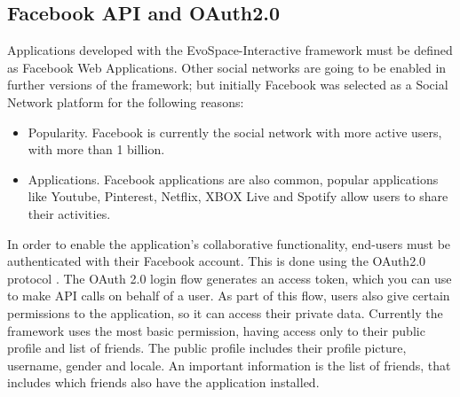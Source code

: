 \documentclass{sig-alternate}
\begin{document}
\subsection{Facebook API and OAuth2.0}
Applications developed with the EvoSpace-Interactive framework must be defined as Facebook Web Applications. Other social networks are going to be enabled in further versions of the framework; but initially Facebook was selected as a Social Network platform for the following reasons:
\begin{itemize}
	\item Popularity. Facebook is currently the social network with more active users, with more than 1 billion. 

	\item Applications. Facebook applications are also common, popular applications like Youtube, Pinterest, Netflix, XBOX Live and Spotify allow users to share their activities.	
\end{itemize}
In order to enable the application's collaborative functionality, end-users must be authenticated with their Facebook account. This is done using the OAuth2.0 protocol \cite{hammer2011oauth}. The OAuth 2.0 login flow generates an access token, which you can use to make API calls on behalf of a user. As part of this flow, users also give certain permissions to the application, so it can access their private data. Currently the framework uses the most basic permission, having access only to their public profile and list of friends. The public profile includes their profile picture, username, gender and locale. An important information is the list of friends, that includes which friends also have the application installed. 
\end{document}
